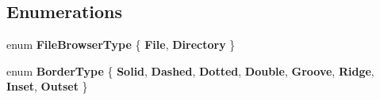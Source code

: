 \subsection*{Enumerations}
\begin{DoxyCompactItemize}
\item 
\mbox{\label{namespace_lerp2_a_p_i_1_1_utility_af5d628470963cc0f18c37055b4170bf1}} 
enum {\bfseries File\+Browser\+Type} \{ {\bfseries File}, 
{\bfseries Directory}
 \}
\item 
\mbox{\label{namespace_lerp2_a_p_i_1_1_utility_a8046e09472382edc5b740291a380c94c}} 
enum {\bfseries Border\+Type} \{ \newline
{\bfseries Solid}, 
{\bfseries Dashed}, 
{\bfseries Dotted}, 
{\bfseries Double}, 
\newline
{\bfseries Groove}, 
{\bfseries Ridge}, 
{\bfseries Inset}, 
{\bfseries Outset}
 \}
\end{DoxyCompactItemize}
